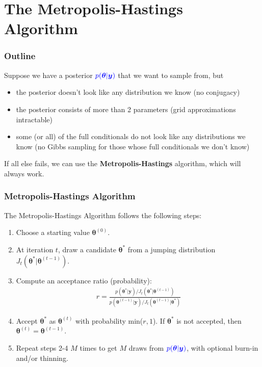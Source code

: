 \documentclass{beamer}
\begin{document}
\section{The Metropolis-Hastings Algorithm}

\begin{frame}
\frametitle{Outline}
\tableofcontents[currentsection]
\end{frame}

\begin{frame}
Suppose we have a posterior $\textcolor{blue}{p(\bm{\theta} | \bm{y})}$ that we want to
sample from, but
\pause
\begin{itemize}
\item the posterior doesn't look like any distribution we know (no conjugacy)
\pause
\item the posterior consists of more than 2 parameters (grid
approximations intractable)
\pause
\item some (or all) of the full conditionals do not look like any
distributions we know (no Gibbs sampling for those whose full
conditionals we don't know)
\end{itemize}
\pause
\bigskip
If all else fails, we can use the \textbf{Metropolis-Hastings}
algorithm, which will always work.
\end{frame}

\begin{frame}
\frametitle{Metropolis-Hastings Algorithm}
\pause
The Metropolis-Hastings Algorithm follows the following steps:
\pause
\bigskip
\begin{enumerate}
\item Choose a starting value $\bm{\theta}^{(0)}$.
\pause
\item At iteration $t$, draw a candidate $\bm{\theta}^*$ from a jumping
distribution $J_t(\bm{\theta}^* | \bm{\theta}^{(t-1)})$.
\pause
\item Compute an acceptance ratio (probability):
\begin{eqnarray*}
r = \frac{p(\bm{\theta}^* | \bm{y})/J_t(\bm{\theta}^* | \bm{\theta}^{(t-1)})}{p(\bm{\theta}^{(t-1)} | \bm{y})/J_t(\bm{\theta}^{(t-1)} | \bm{\theta}^*)}
\end{eqnarray*}
\pause
\item Accept $\bm{\theta}^*$ as $\bm{\theta}^{(t)}$ with probability
min($r,1$).  If $\bm{\theta}^*$ is not accepted, then $\bm{\theta}^{(t)} = \bm{\theta}^{(t-1)}$.
\pause
\item Repeat steps 2-4 $M$ times to get $M$ draws from $\textcolor{blue}{p(\bm{\theta}
| \bm{y})}$, with optional burn-in and/or thinning.
\end{enumerate}
\end{frame}
\end{document}
